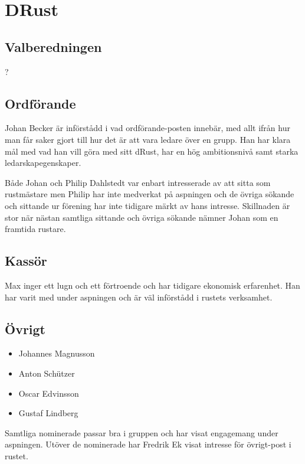 \section{DRust}

\subsection{Valberedningen}
\begin{autoframe}
?
\end{autoframe}


\subsection{Ordförande}
\begin{autoframe}

Johan Becker är införstådd i vad ordförande-posten innebär, med allt ifrån hur man får saker gjort till hur det är att vara ledare över en grupp.  Han har klara mål med vad han vill göra med sitt dRust, har en hög ambitionsnivå samt starka ledarskapegenskaper. 

\bigskip
Både Johan och Philip Dahlstedt var enbart intresserade av att sitta som rustmästare men Philip har inte medverkat på aspningen och de övriga sökande och sittande ur förening har inte tidigare märkt av hans intresse. Skillnaden är stor när nästan samtliga sittande och övriga sökande nämner Johan som en framtida rustare.  
\end{autoframe}

\subsection{Kassör}
\begin{autoframe}

Max inger ett lugn och ett förtroende och har tidigare ekonomisk erfarenhet. Han har varit med under aspningen och är väl införstådd i rustets verksamhet.
\end{autoframe}

\subsection{Övrigt}
\begin{autoframe}

\begin{itemize}
\item Johannes Magnusson
\item Anton Schützer
\item Oscar Edvinsson
\item Gustaf Lindberg
\end{itemize}

\bigskip
Samtliga nominerade passar bra i gruppen och har visat engagemang under aspningen.  Utöver de nominerade har Fredrik Ek visat intresse för övrigt-post i rustet. 
\end{autoframe}